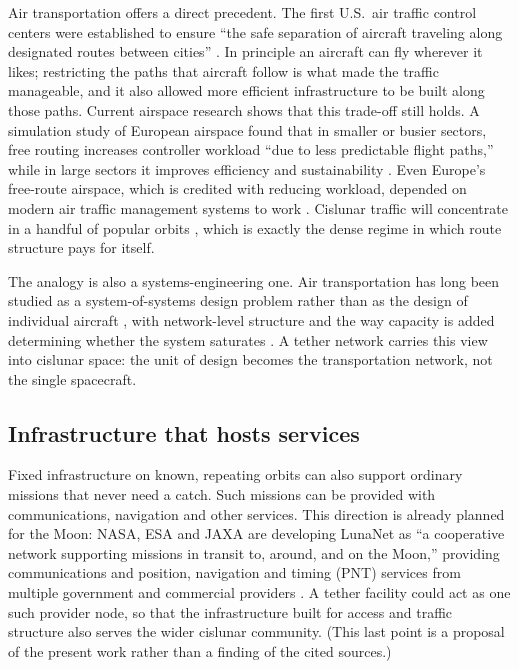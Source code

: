\documentclass[11pt]{article}
\begin{document}
Air transportation offers a direct precedent.
The first U.S.\ air traffic control centers were established to ensure ``the safe separation of aircraft traveling along designated routes between cities'' \parencite{PrestonFAA}.
In principle an aircraft can fly wherever it likes; restricting the paths that aircraft follow is what made the traffic manageable, and it also allowed more efficient infrastructure to be built along those paths.
Current airspace research shows that this trade-off still holds.
A simulation study of European airspace found that in smaller or busier sectors, free routing increases controller workload ``due to less predictable flight paths,'' while in large sectors it improves efficiency and sustainability \parencite{Toanchina2024}.
Even Europe's free-route airspace, which is credited with reducing workload, depended on modern air traffic management systems to work \parencite{IAR2018FRA}.
Cislunar traffic will concentrate in a handful of popular orbits \parencite{GaTech2025Cislunar}, which is exactly the dense regime in which route structure pays for itself.

The analogy is also a systems-engineering one.
Air transportation has long been studied as a system-of-systems design problem rather than as the design of individual aircraft \parencite{DeLaurentis2005}, with network-level structure and the way capacity is added determining whether the system saturates \parencite{DeLaurentisHan2006}.
A tether network carries this view into cislunar space: the unit of design becomes the transportation network, not the single spacecraft.

\subsection{Infrastructure that hosts services}

Fixed infrastructure on known, repeating orbits can also support ordinary missions that never need a catch.
Such missions can be provided with communications, navigation and other services.
This direction is already planned for the Moon: NASA, ESA and JAXA are developing LunaNet as ``a cooperative network supporting missions in transit to, around, and on the Moon,'' providing communications and position, navigation and timing (PNT) services from multiple government and commercial providers \parencite{LunaNetV5}.
A tether facility could act as one such provider node, so that the infrastructure built for access and traffic structure also serves the wider cislunar community.
(This last point is a proposal of the present work rather than a finding of the cited sources.)
\end{document}
